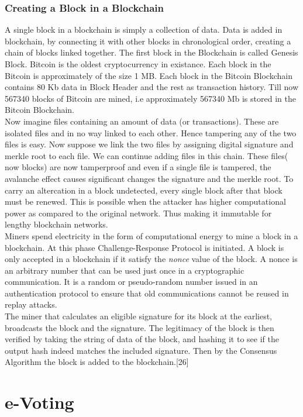 \documentclass{article}
\begin{document}
\subsection{Creating a Block in a Blockchain}
A single block in a blockchain is simply a collection of data. Data is added in blockchain, by connecting it with other blocks in chronological order, creating a chain of blocks linked together. The first block in the Blockchain is called Genesis Block. Bitcoin is the oldest cryptocurrency in existance. Each block in the Bitcoin is approximately of the size 1 MB. Each block in the Bitcoin Blockchain contains 80 Kb data in Block Header and the rest as transaction history. Till now 567340 blocks of Bitcoin are mined, i.e approximately 567340 Mb is stored in the Bitcoin Blockchain.\\
Now imagine files containing an amount of data (or transactions). These are isolated files and in no way linked to each other. Hence tampering any of the two files is easy. Now suppose we link the two files by assigning digital signature and merkle root to each file. We can continue adding files in this chain. These files( now blocks) are now tamperproof and even if a single file is tampered, the avalanche effect causes significant changes the signature and the merkle root. To carry an altercation in a block undetected, every single block after that block must be renewed. This is possible when the attacker has higher computational power as compared to the original network. Thus making it immutable for lengthy blockchain networks.
\\
Miners spend electricity in the form of computational energy to mine a block in a blockchain. At this phase Challenge-Response Protocol is initiated. A block is only accepted in a blockchain if it satisfy the \textit{nonce} value of the block. A nonce is an arbitrary number that can be used just once in a cryptographic communication. It is a random or pseudo-random number issued in an authentication protocol to ensure that old communications cannot be reused in replay attacks.\\
The miner that calculates an eligible signature for its block at the earliest, broadcasts the block and the signature. The legitimacy of the block is then verified by taking the string of data of the block, and hashing it to see if the output hash indeed matches the included signature. Then by the Consensus Algorithm the block is added to the  blockchain.[26]

\chapter{e-Voting}
\end{document}
